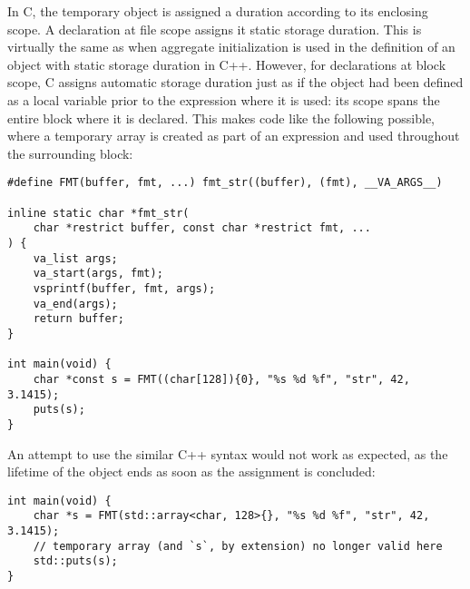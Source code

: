 In C, the temporary object is assigned a duration according to its enclosing
scope.  A declaration at file scope assigns it static storage duration.  This is
virtually the same as when aggregate initialization is used in the definition of
an object with static storage duration in C++.  However, for declarations at
block scope, C assigns automatic storage duration just as if the object had been
defined as a local variable prior to the expression where it is used: its scope
spans the entire block where it is declared.  This makes code like the following
possible, where a temporary array is created as part of an expression and used
throughout the surrounding block:

\begin{lstlisting}[style=c]
#define FMT(buffer, fmt, ...) fmt_str((buffer), (fmt), __VA_ARGS__)

inline static char *fmt_str(
    char *restrict buffer, const char *restrict fmt, ...
) {
    va_list args;
    va_start(args, fmt);
    vsprintf(buffer, fmt, args);
    va_end(args);
    return buffer;
}

int main(void) {
    char *const s = FMT((char[128]){0}, "%s %d %f", "str", 42, 3.1415);
    puts(s);
}
\end{lstlisting}

An attempt to use the similar C++ syntax would not work as expected, as the
lifetime of the object ends as soon as the assignment is concluded:

\begin{lstlisting}[style=c++]
int main(void) {
    char *s = FMT(std::array<char, 128>{}, "%s %d %f", "str", 42, 3.1415);
    // temporary array (and `s`, by extension) no longer valid here
    std::puts(s);
}
\end{lstlisting}
